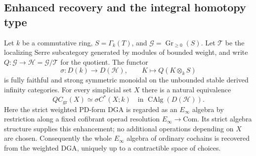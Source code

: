 \subsection{Enhanced recovery and the integral homotopy type}

\begin{theorem}
\label{sa08:D006E}
Let $k$ be a commutative ring, $S=\Gamma_k(T)$, and
$\mathcal G=\operatorname{Gr}_{\geq0}(S)$. Let $\mathcal T$ be the
localizing Serre subcategory generated by modules of bounded weight,
and write $Q:\mathcal G\to\mathcal H=\mathcal G/\mathcal T$ for the
quotient. The functor
\[
 \sigma:D(k)\longrightarrow D(\mathcal H),\qquad
 K\longmapsto Q(K\otimes_k S)
\]
is fully faithful and strong symmetric monoidal on the unbounded
stable derived infinity categories. For every simplicial set $X$ there
is a natural equivalence
\[
 Q C_{\mathrm{gr}}(X)\simeq\sigma C^*(X;k)
 \quad\text{in }\operatorname{CAlg}(D(\mathcal H)).
\]
Here the strict weighted PD-form DGA is regarded as an
$E_\infty$ algebra by restriction along a fixed cofibrant operad
resolution $E_\infty\to\mathrm{Com}$. Its strict algebra structure
supplies this enhancement; no additional operations depending on $X$
are chosen. Consequently the whole $E_\infty$ algebra of ordinary
cochains is recovered from the weighted DGA, uniquely up to a
contractible space of choices.
\end{theorem}

